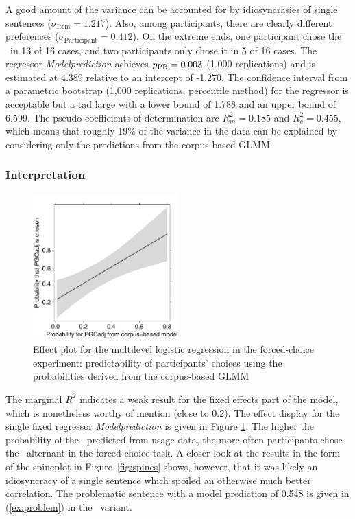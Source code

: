 A good amount of the variance can be accounted for by idiosyncrasies of single sentences ($\sigma_{\text{Item}}=1.217$).
Also, among participants, there are clearly different preferences ($\sigma_{\text{Participant}}=0.412$).
On the extreme ends, one participant chose the \PGCa\ in 13 of 16 cases, and two participants only chose it in 5 of 16 cases.
The regressor \textit{Modelprediction} achieves $p_{\text{PB}}=0.003$ (1,000 replications) and is estimated at 4.389 relative to an intercept of -1.270.
The confidence interval from a parametric bootstrap (1,000 replications, percentile method) for the regressor is acceptable but a tad large with a lower bound of 1.788 and an upper bound of 6.599.
The pseudo-coefficients of determination are $R^2_{m}=0.185$ and $R^2_{c}=0.455$, which means that roughly 19\% of the variance in the data can be explained by considering only the predictions from the corpus-based GLMM.

\subsubsection{Interpretation}

\begin{figure}[htbp!]
\centering
\includegraphics[width=0.5\textwidth]{../R/output/fc_effects}
\caption{Effect plot for the multilevel logistic regression in the forced-choice experiment: predictability of participants' choices using the probabilities derived from the corpus-based GLMM}
\label{fig:afc:effects}
\end{figure}

The marginal $R^2$ indicates a weak result for the fixed effects part of the model, which is nonetheless worthy of mention (close to 0.2).
The effect display for the single fixed regressor \textit{Modelprediction} is given in Figure \ref{fig:afc:effects}.
The higher the probability of the \PGCa\ predicted from usage data, the more often participants chose the \PGCa\ alternant in the forced-choice task.
A closer look at the results in the form of the spineplot in Figure~\ref{fig:spines} shows, however, that it was likely an idiosyncracy of a single sentence which spoiled an otherwise much better correlation.
The problematic sentence with a model prediction of 0.548 is given in (\ref{ex:problem}) in the \PGCa\ variant.

